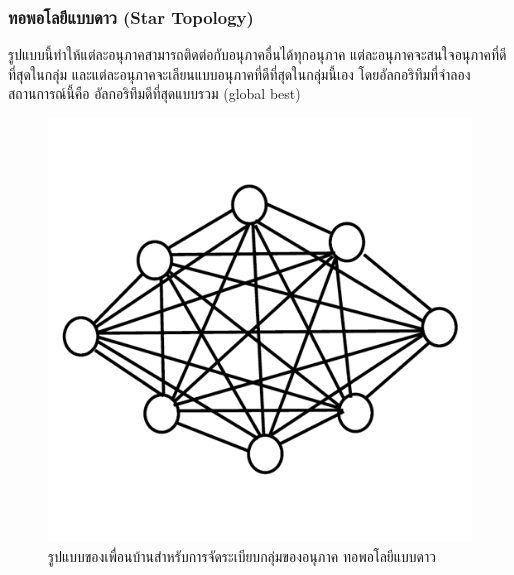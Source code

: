 \subsubsection{ทอพอโลยีแบบดาว (Star Topology)}
รูปแบบนี้ทำให้แต่ละอนุภาคสามารถติดต่อกับอนุภาคอื่นได้ทุกอนุภาค แต่ละอนุภาคจะสนใจอนุภาคที่ดีที่สุดในกลุ่ม และแต่ละอนุภาคจะเลียนแบบอนุภาคที่ดีที่สุดในกลุ่มนี้เอง โดยอัลกอริทึมที่จำลองสถานการณ์นี้คือ อัลกอริทึมดีที่สุดแบบรวม (global best)
\begin{figure}[ht]
    \centering
    \includegraphics[scale=0.3]{images/star_topology.png}
    \caption{รูปแบบของเพื่อนบ้านสำหรับการจัดระเบียบกลุ่มของอนุภาค ทอพอโลยีแบบดาว}
    \label{fig:5}
\end{figure}

